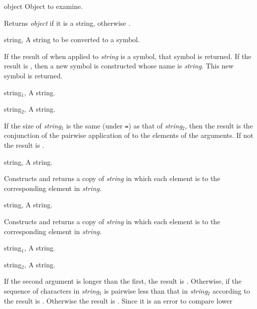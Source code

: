 \begin{optDefinition}
\begin{arguments}
    \item[object] Object to examine.
\end{arguments}
%
\result
Returns {\em object\/} if it is a string, otherwise \nil{}.
%
\begin{specargs}
    \item[string, \classref{string}] A string to be converted to a symbol.
\end{specargs}
%
\result
If the result of  when applied to {\em string\/}
is a symbol, that symbol is returned.  If the result is \nil{}, then
a new symbol is constructed whose name is {\em string}.  This new
symbol is returned.
%
%
\begin{specargs}
    \item[string$_1$, \classref{string}] A string.
    \item[string$_2$, \classref{string}] A string.
\end{specargs}
%
\result
If the size of {\em string$_1$} is the same (under {\tt =}) as that of
{\em string$_2$}, then the result is the conjunction of the pairwise
application of  to the elements of the arguments.  If not
the result is \nil{}.
%
%
\begin{specargs}
    \item[string, \classref{string}] A string.
\end{specargs}
%
\result
Constructs and returns a copy of {\em string\/} in which each element
is  to the corresponding element in {\em string}.
%
%
\begin{specargs}
    \item[string, \classref{string}] A string.
\end{specargs}
%
\result
Constructs and returns a copy of {\em string\/} in which each element
is  to the corresponding element in {\em string}.
%
%
\begin{specargs}
    \item[string$_1$, \classref{string}] A string.
    \item[string$_2$, \classref{string}] A string.
\end{specargs}
%
\result%
If the second argument is longer than the first, the result is \nil{}.
Otherwise, if the sequence of characters in {\em string$_1$} is pairwise less
than that in {\em string$_2$} according to  the result is
\true.  Otherwise the result is \nil{}.  Since it is an error to compare lower

\end{optDefinition}
